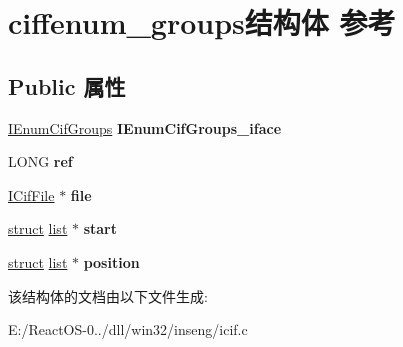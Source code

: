 \hypertarget{structciffenum__groups}{}\section{ciffenum\+\_\+groups结构体 参考}
\label{structciffenum__groups}
\subsection*{Public 属性}
\begin{DoxyCompactItemize}
\item 
\mbox{\label{structciffenum__groups_a9127b36e5c9fac8d9f6528c98244c039}} 
\hyperlink{interface_i_enum_cif_groups}{I\+Enum\+Cif\+Groups} {\bfseries I\+Enum\+Cif\+Groups\+\_\+iface}
\item 
\mbox{\label{structciffenum__groups_a0987cc517b4d466bf31b1ee6a36f1c5a}} 
L\+O\+NG {\bfseries ref}
\item 
\mbox{\label{structciffenum__groups_a75e12187afe7cdf6165e6e5e0eae7de4}} 
\hyperlink{interface_i_cif_file}{I\+Cif\+File} $\ast$ {\bfseries file}
\item 
\mbox{\label{structciffenum__groups_a8f3cb4889ad205e84b207bd145da79e2}} 
\hyperlink{interfacestruct}{struct} \hyperlink{classlist}{list} $\ast$ {\bfseries start}
\item 
\mbox{\label{structciffenum__groups_a319f271bb0544819f64076b3e46b1a6e}} 
\hyperlink{interfacestruct}{struct} \hyperlink{classlist}{list} $\ast$ {\bfseries position}
\end{DoxyCompactItemize}


该结构体的文档由以下文件生成\+:\begin{DoxyCompactItemize}
\item 
E\+:/\+React\+O\+S-\/0../dll/win32/inseng/icif.\+c\end{DoxyCompactItemize}
